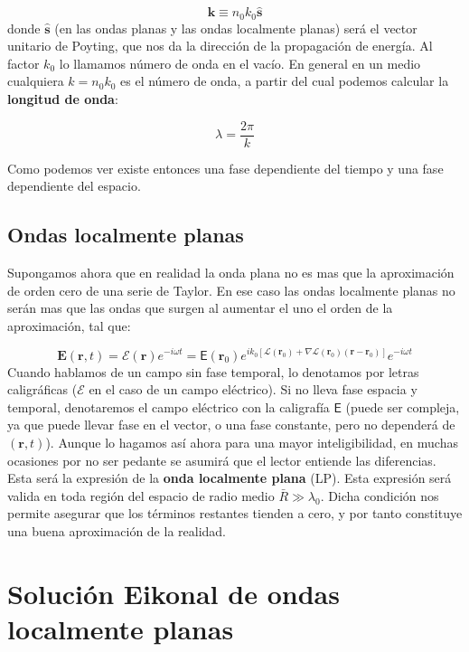 \documentclass[12pt,a4paper]{book}
\numberwithin{equation}{section}
\numberwithin{figure}{section}
\newcommand{\1}{_{(1)}}
\newcommand{\2}{_{(2)}}
\newcommand{\rn}{\mathbf{r}}
\newcommand{\kn}{\mathbf{k}}
\newcommand{\sn}{\mathbf{s}}
\newcommand{\En}{\mathbf{E}}
\newcommand{\Encal}{\boldsymbol{\mathcal{E}}}
\newcommand{\hns}{\hat{\sn}}
\theoremstyle{definition}
\begin{document}
\begin{equation}
\kn \equiv n_0 k_0 \hns
\end{equation}
donde $\hns$ (en las ondas planas y las ondas localmente planas) será el vector unitario de Poyting, que nos da la dirección de la propagación de energía. Al factor $k_0$ lo llamamos número de onda en el vacío. En general en un medio cualquiera $k=n_0 k_0$ es el número de onda, a partir del cual podemos calcular la \textbf{longitud de onda}:

\begin{equation}
\lambda = \dfrac{2 \pi}{k}
\end{equation}

Como podemos ver existe entonces una fase dependiente del tiempo y una fase dependiente del espacio.

\subsection{Ondas localmente planas}

 Supongamos ahora que en realidad la onda plana no es mas que la aproximación de orden cero de una serie de Taylor. En ese caso las ondas localmente planas no serán mas que las ondas que surgen al aumentar el uno el orden de la aproximación, tal que:
 
\begin{equation}
\En (\rn,t) = \Encal (\rn) e^{-i \omega t} = \mathsf{E} (\rn_0) e^{ik_0[\mathcal{L} (\rn_0) + \nabla \mathcal{L} (\rn_0) (\rn - \rn_0)]} e^{- i \omega t}
\end{equation}
Cuando hablamos de un campo sin fase temporal, lo denotamos por letras caligráficas ($\mathcal{E}$ en el caso de un campo eléctrico). Si no lleva fase espacia y temporal, denotaremos el campo eléctrico con la caligrafía $\mathsf{E}$ (puede ser compleja, ya que puede llevar fase en el vector, o una fase constante, pero no dependerá de $(\rn,t)$). Aunque lo hagamos así ahora para una mayor inteligibilidad, en muchas ocasiones por no ser pedante se asumirá que el lector entiende las diferencias. Esta será la expresión de la \textbf{onda localmente plana} (LP). Esta expresión será valida en toda región del espacio de radio medio $\bar{R} \gg \lambda_0$. Dicha condición nos permite asegurar que los términos restantes tienden a cero, y por tanto constituye una buena aproximación de la realidad.

\section{Solución Eikonal de ondas localmente planas}
\end{document}

